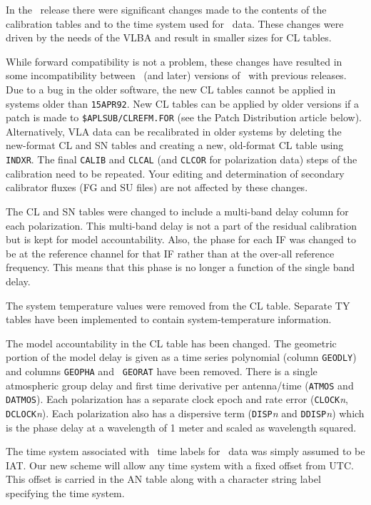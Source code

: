    In the \RELEASENAME\  release there were significant changes made
to the contents of the calibration tables and to the time system used
for \uv\ data.  These changes were driven by the needs of the VLBA and
result in smaller sizes for CL tables.

   While forward compatibility is not a problem, these changes have
resulted in some incompatibility between \RELEASENAME\  (and later)
versions of \AIPS\ with previous releases.  Due to a bug in the older
software, the new CL tables cannot be applied in systems older than
\hbox{{\tt 15APR92}}.  New CL tables can be applied by older versions
if a patch is made to {\tt \$APLSUB/CLREFM.FOR} (see the Patch
Distribution article below). Alternatively, VLA data can be
recalibrated in older systems by deleting the new-format CL and SN
tables and creating a new, old-format CL table using \hbox{{\tt
INDXR}}.  The final {\tt CALIB} and {\tt CLCAL} (and {\tt CLCOR} for
polarization data) steps of the calibration need to be repeated.  Your
editing and determination of secondary calibrator fluxes (FG and SU
files) are not affected by these changes.

   The CL and SN tables were changed to include a multi-band delay
column for each polarization.  This multi-band delay is not a part of
the residual calibration but is kept for model accountability.  Also,
the phase for each IF was changed to be at the reference channel for
that IF rather than at the over-all reference frequency.  This means
that this phase is no longer a function of the single band delay.

   The system temperature values were removed from the CL table.
Separate TY tables have been implemented to contain system-temperature
information.

   The model accountability in the CL table has been changed.  The
geometric portion of the model delay is given as a time series
polynomial (column {\tt GEODLY}) and columns {\tt GEOPHA} and {\tt
GEORAT} have been removed.  There is a single atmospheric group delay
and first time derivative per antenna/time ({\tt ATMOS} and {\tt
DATMOS}).  Each polarization has a separate clock epoch and rate error
({\tt CLOCK}{\it n}, {\tt DCLOCK}{\it n}).  Each polarization also has
a dispersive term ({\tt DISP}{\it n} and {\tt DDISP}{\it n}) which is
the phase delay at a wavelength of 1 meter and scaled as wavelength
squared.

   The time system associated with \AIPS\ time labels for \uv\ data
was simply assumed to be \hbox{IAT}.  Our new scheme will allow any
time system with a fixed offset from \hbox{UTC}.  This offset is
carried in the AN table along with a character string label specifying
the time system.

